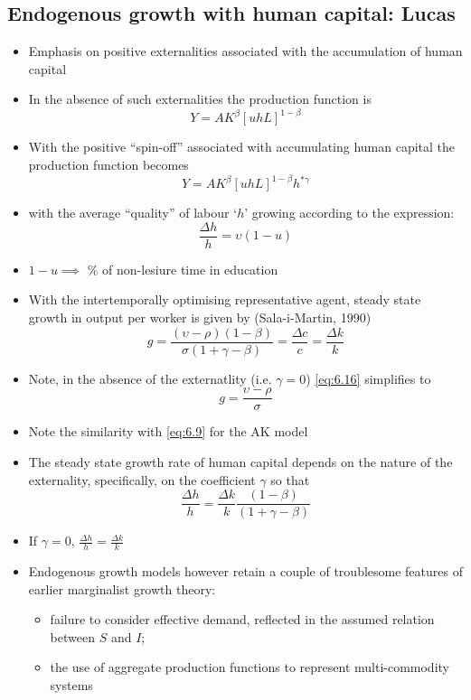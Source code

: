 \documentclass[a4paper,twoside]{article}
\numberwithin{equation}{section}
\numberwithin{figure}{section}
\begin{document}
\subsection{Endogenous growth with human capital: Lucas}
\begin{itemize}
	\item Emphasis on positive externalities associated with the accumulation of human capital
	\item In the absence of such externalities the production function is
	\begin{equation}
		Y = AK^\beta [uhL]^{1-\beta} \label{eq:6.13}
	\end{equation}
	\item With the positive ``spin-off'' associated with accumulating human capital the production function becomes
	\begin{equation}
		Y = AK^\beta [uhL]^{1-\beta} h^{\ast\gamma} \label{eq:6.14}
	\end{equation}
	\item with the average ``quality'' of labour `\( h \)' growing according to the expression:
	\begin{equation}
		\frac{\Delta h}{h} = \upsilon(1-u) \label{eq:6.15}
	\end{equation}
	\item \( 1 - u \implies \) \% of non-lesiure time in education
	\item With the intertemporally optimising representative agent, steady state growth in output per worker is given by (Sala-i-Martin, 1990) 
	\begin{equation}
		g = \frac{(\upsilon - \rho)(1-\beta)}{\sigma(1+\gamma-\beta)} = \frac{\Delta c}{c} = \frac{\Delta k}{k} \label{eq:6.16}
	\end{equation}
	\item Note, in the absence of the externatlity (i.e. \( \gamma = 0 \)) \cref{eq:6.16} simplifies to
	\begin{equation}
		g = \frac{\upsilon - \rho}{\sigma} \label{eq:6.17}
	\end{equation}
	\item Note the similarity with \cref{eq:6.9} for the AK model
	\item The steady state growth rate of human capital depends on the nature of the externality, specifically, on the coefficient \( \gamma \) so that
	\begin{equation}
		\frac{\Delta h}{h} = \frac{\Delta k}{k} \frac{(1-\beta)}{(1 + \gamma - \beta)} \label{eq:6.18}
	\end{equation}
	\item If \( \gamma = 0 \), \( \frac{\Delta h}{h} = \frac{\Delta k}{k} \)  
	\item Endogenous growth models however retain a couple of troublesome features of earlier marginalist growth theory:
	\begin{itemize}
		\item failure to consider effective demand, reflected in the assumed relation between \( S \) and \( I \);
		\item the use of aggregate production functions to represent multi-commodity systems
	\end{itemize}
\end{itemize}
\end{document}
